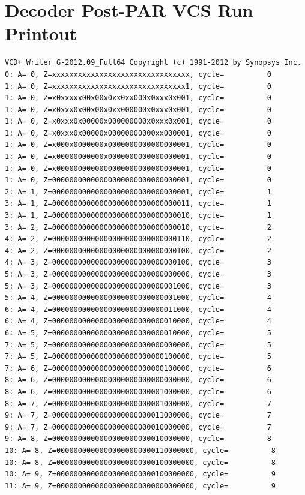 \documentclass[11pt]{article}
\begin{document}
\section{Decoder Post-PAR VCS Run Printout}
\begin{verbatim}
VCD+ Writer G-2012.09_Full64 Copyright (c) 1991-2012 by Synopsys Inc.
0: A= 0, Z=xxxxxxxxxxxxxxxxxxxxxxxxxxxxxxxx, cycle=          0
1: A= 0, Z=xxxxxxxxxxxxxxxxxxxxxxxxxxxxxxx1, cycle=          0
1: A= 0, Z=x0xxxxx00x00x0xx0xx000x0xxx0x001, cycle=          0
1: A= 0, Z=x0xxx0x00x00x0xx000000x0xxx0x001, cycle=          0
1: A= 0, Z=x0xxx0x00000x000000000x0xxx0x001, cycle=          0
1: A= 0, Z=x0xxx0x00000x00000000000xx000001, cycle=          0
1: A= 0, Z=x000x0000000x0000000000000000001, cycle=          0
1: A= 0, Z=x00000000000x0000000000000000001, cycle=          0
1: A= 0, Z=x0000000000000000000000000000001, cycle=          0
1: A= 0, Z=00000000000000000000000000000001, cycle=          0
2: A= 1, Z=00000000000000000000000000000001, cycle=          1
3: A= 1, Z=00000000000000000000000000000011, cycle=          1
3: A= 1, Z=00000000000000000000000000000010, cycle=          1
3: A= 2, Z=00000000000000000000000000000010, cycle=          2
4: A= 2, Z=00000000000000000000000000000110, cycle=          2
4: A= 2, Z=00000000000000000000000000000100, cycle=          2
4: A= 3, Z=00000000000000000000000000000100, cycle=          3
5: A= 3, Z=00000000000000000000000000000000, cycle=          3
5: A= 3, Z=00000000000000000000000000001000, cycle=          3
5: A= 4, Z=00000000000000000000000000001000, cycle=          4
6: A= 4, Z=00000000000000000000000000011000, cycle=          4
6: A= 4, Z=00000000000000000000000000010000, cycle=          4
6: A= 5, Z=00000000000000000000000000010000, cycle=          5
7: A= 5, Z=00000000000000000000000000000000, cycle=          5
7: A= 5, Z=00000000000000000000000000100000, cycle=          5
7: A= 6, Z=00000000000000000000000000100000, cycle=          6
8: A= 6, Z=00000000000000000000000000000000, cycle=          6
8: A= 6, Z=00000000000000000000000001000000, cycle=          6
8: A= 7, Z=00000000000000000000000001000000, cycle=          7
9: A= 7, Z=00000000000000000000000011000000, cycle=          7
9: A= 7, Z=00000000000000000000000010000000, cycle=          7
9: A= 8, Z=00000000000000000000000010000000, cycle=          8
10: A= 8, Z=00000000000000000000000110000000, cycle=          8
10: A= 8, Z=00000000000000000000000100000000, cycle=          8
10: A= 9, Z=00000000000000000000000100000000, cycle=          9
11: A= 9, Z=00000000000000000000000000000000, cycle=          9

\end{verbatim}
\end{document}
